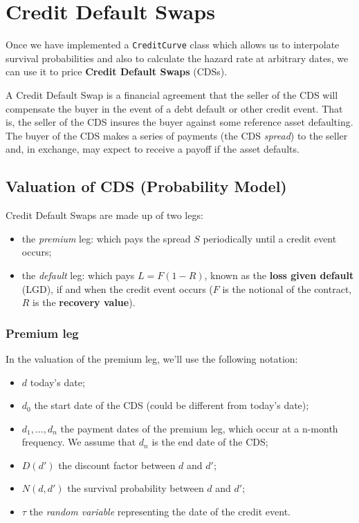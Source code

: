 \section{Credit Default Swaps}\label{credit-deafult-swaps}

Once we have implemented a \texttt{CreditCurve} class which allows us to
interpolate survival probabilities and also to calculate the hazard rate at arbitrary
dates, we can use it to price \textbf{Credit Default Swaps} (CDSs).

A Credit Default Swap is a financial agreement that the seller of the CDS will compensate the buyer in the event of a debt default or other credit event. 
That is, the seller of the CDS insures the buyer against some reference asset defaulting. The buyer of the CDS makes a series of payments (the CDS \emph{spread}) to the seller and, in exchange, may expect to receive a payoff if the asset defaults.

\subsection{Valuation of CDS (Probability Model)}
\label{sec:cds_valuation}

Credit Default Swaps are made up of two legs:

\begin{itemize}
\tightlist
\item
  the \emph{premium} leg: which pays the spread \(S\) periodically until a credit event occurs;
\item
  the \emph{default} leg: which pays \(L = F(1 - R)\), known as the
  \textbf{loss given default} (LGD), if and when the credit event occurs ($F$ is the notional of the contract, $R$ is the \textbf{recovery value}).
\end{itemize}

\subsubsection{Premium leg}\label{premium-leg}

In the valuation of the premium leg, we'll use the following notation:

\begin{itemize}
\tightlist
\item
  \(d\) today's date;
\item
  \(d_0\) the start date of the CDS (could be different from today's date);
\item
  \(d_1, ..., d_n\) the payment dates of the premium leg, which occur at
  a n-month frequency. We assume that \(d_n\) is the end date of the CDS;
\item
  \(D(d')\) the discount factor between \(d\) and \(d'\);
\item
  \(N(d, d')\) the survival probability between \(d\) and \(d'\);
\item
  \(\tau\) the \emph{random variable} representing the date of the credit event.
\end{itemize}

